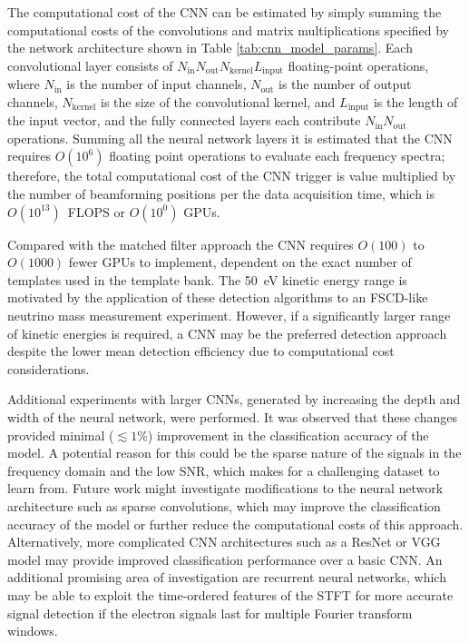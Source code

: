The computational cost of the CNN can be estimated by simply summing the computational costs of the convolutions and matrix multiplications specified by the network architecture shown in Table \ref{tab:cnn_model_params}. Each convolutional layer consists of $N_\mathrm{in}N_\mathrm{out}N_\mathrm{kernel}L_\mathrm{input}$ floating-point operations, where $N_\mathrm{in}$ is the number of input channels, $N_\mathrm{out}$ is the number of output channels, $N_\mathrm{kernel}$ is the size of the convolutional kernel, and $L_\mathrm{input}$ is the length of the input vector, and the fully connected layers each contribute $N_\mathrm{in}N_\mathrm{out}$ operations. Summing all the neural network layers it is estimated that the CNN requires $O(10^6)$ floating point operations to evaluate each frequency spectra; therefore, the total computational cost of the CNN trigger is value multiplied by the number of beamforming positions per the data acquisition time, which is $O(10^{13})$~FLOPS or $O(10^0)$ GPUs.

Compared with the matched filter approach the CNN requires $O(100)$ to $O(1000)$ fewer GPUs to implement, dependent on the exact number of templates used in the template bank. The 50~eV kinetic energy range is motivated by the application of these detection algorithms to an FSCD-like neutrino mass measurement experiment. However, if a significantly larger range of kinetic energies is required, a CNN may be the preferred detection approach despite the lower mean detection efficiency due to computational cost considerations.%


Additional experiments with larger CNNs, generated by increasing the depth and width of the neural network, were performed. It was observed that these changes provided minimal ($\lesssim 1\%$) improvement in the classification accuracy of the model. A potential reason for this could be the sparse nature of the signals in the frequency domain and the low SNR, which makes for a challenging dataset to learn from. Future work might investigate modifications to the neural network architecture such as sparse convolutions, which may improve the classification accuracy of the model or further reduce the computational costs of this approach. Alternatively, more complicated CNN architectures such as a ResNet \cite{resnet} or VGG model \cite{vgg} may provide improved classification performance over a basic CNN. An additional promising area of investigation are recurrent neural networks, which may be able to exploit the time-ordered features of the STFT for more accurate signal detection if the electron signals last for multiple Fourier transform windows.

